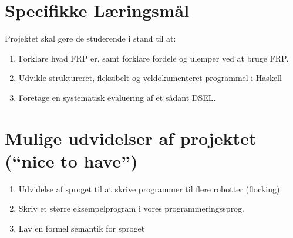 \documentclass[a4paper,oneside, draft]{memoir}
\begin{document}
\section{Specifikke Læringsmål}

Projektet skal gøre de studerende i stand til at:

\begin{enumerate}

\item Forklare hvad FRP er, samt forklare fordele og ulemper ved at bruge FRP.

\item Udvikle struktureret, fleksibelt og veldokumenteret programmel i Haskell


\item Foretage en systematisk evaluering af et sådant DSEL. 

\end{enumerate}


\section{Mulige udvidelser af projektet ("`nice to have"')}
\begin{enumerate}

\item Udvidelse af sproget til at skrive programmer til flere robotter (flocking).

\item Skriv et større eksempelprogram i vores programmeringssprog.

\item Lav en formel semantik for sproget

\end{enumerate}


\end{document}
